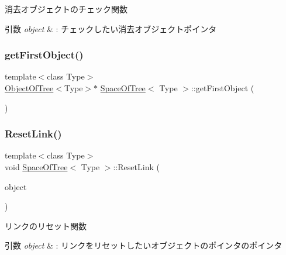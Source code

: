 消去オブジェクトのチェック関数 


\begin{DoxyParams}{引数}
{\em object} & \+: チェックしたい消去オブジェクトポインタ \\
\hline
\end{DoxyParams}
\mbox{\label{class_space_of_tree_a97ee8bf10b8d88d49e61875c88608b15}} 
\subsubsection{\texorpdfstring{get\+First\+Object()}{getFirstObject()}}
{\footnotesize\ttfamily template$<$class Type$>$ \\
\mbox{\hyperlink{class_object_of_tree}{Object\+Of\+Tree}}$<$Type$>$$\ast$ \mbox{\hyperlink{class_space_of_tree}{Space\+Of\+Tree}}$<$ Type $>$\+::get\+First\+Object (\begin{DoxyParamCaption}{ }\end{DoxyParamCaption})\hspace{0.3cm}{\ttfamily [inline]}}

\mbox{\label{class_space_of_tree_a3231408434cb3066768cfd9d33d86190}} 
\subsubsection{\texorpdfstring{Reset\+Link()}{ResetLink()}}
{\footnotesize\ttfamily template$<$class Type$>$ \\
void \mbox{\hyperlink{class_space_of_tree}{Space\+Of\+Tree}}$<$ Type $>$\+::Reset\+Link (\begin{DoxyParamCaption}\item[{\mbox{\hyperlink{class_object_of_tree}{Object\+Of\+Tree}}$<$ Type $>$ $\ast$$\ast$}]{object }\end{DoxyParamCaption})\hspace{0.3cm}{\ttfamily [inline]}}



リンクのリセット関数 


\begin{DoxyParams}{引数}
{\em object} & \+: リンクをリセットしたいオブジェクトのポインタのポインタ \\
\hline
\end{DoxyParams}
\mbox{\label{class_space_of_tree_a43844bf7bfbf0d021b9ae4708cb2e6f4}} 
